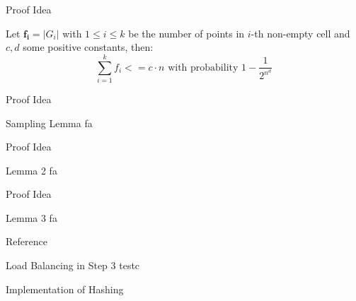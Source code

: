 \documentclass[18pt]{beamer}
\begin{document}
\begin{frame}{Proof Idea}
\begin{theorem}
		Let $\boldsymbol{f_i} = |G_i|$ with $1\leq i \leq k$ be the number of points in $i$-th non-empty cell and $c, d$ some positive constants, then: 
	$$\sum_{i=1}^k f_i <= c \cdot n \text{ with probability } 1 - \frac{1}{2^{n^d}}$$
\end{theorem}
\end{frame}

\begin{frame}{Proof Idea}

\begin{block}{Sampling Lemma}
fa
\end{block}

\end{frame}

\begin{frame}{Proof Idea}

\begin{block}{Lemma 2}
fa
\end{block}

\end{frame}

\begin{frame}{Proof Idea}

\begin{block}{Lemma 3}
fa
\end{block}

\end{frame}

%

\appendix
\beginbackup

\nocite{major}
\nocite{dietzfelbinger1997reliable}
\nocite{fortune1978note}
\nocite{chap13}
\nocite{web}
\nocite{web2}
\nocite{khuller1995simple}
\nocite{Bentley:1976:DMS:800113.803652}
\nocite{chor1989power}

\begin{frame}[allowframebreaks]{Reference}
\printbibliography
\end{frame}


\begin{frame}{Load Balancing in Step 3}
testc
\end{frame}

\begin{frame}{Implementation of Hashing}

\end{frame}


\backupend
\end{document}
